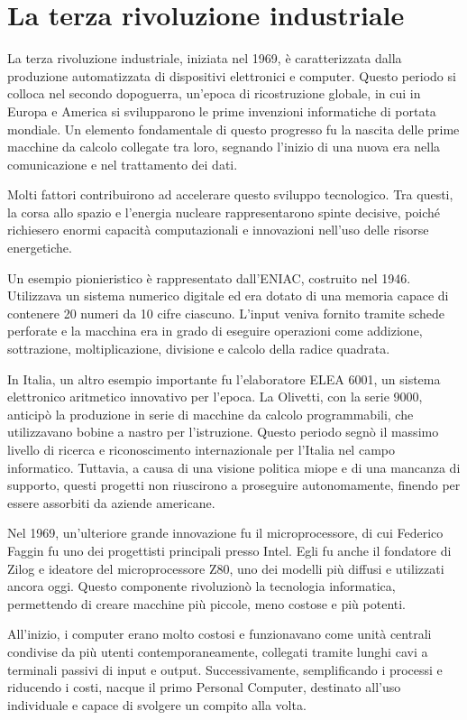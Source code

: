 
\section{La terza rivoluzione industriale}
La terza rivoluzione industriale, iniziata nel 1969, è caratterizzata dalla produzione automatizzata di dispositivi elettronici e computer. Questo periodo si colloca nel secondo dopoguerra, un’epoca di ricostruzione globale, in cui in Europa e America si svilupparono le prime invenzioni informatiche di portata mondiale. Un elemento fondamentale di questo progresso fu la nascita delle prime macchine da calcolo collegate tra loro, segnando l’inizio di una nuova era nella comunicazione e nel trattamento dei dati.

Molti fattori contribuirono ad accelerare questo sviluppo tecnologico. Tra questi, la corsa allo spazio e l’energia nucleare rappresentarono spinte decisive, poiché richiesero enormi capacità computazionali e innovazioni nell’uso delle risorse energetiche.

Un esempio pionieristico è rappresentato dall’ENIAC, costruito nel 1946. Utilizzava un sistema numerico digitale ed era dotato di una memoria capace di contenere 20 numeri da 10 cifre ciascuno. L’input veniva fornito tramite schede perforate e la macchina era in grado di eseguire operazioni come addizione, sottrazione, moltiplicazione, divisione e calcolo della radice quadrata.

In Italia, un altro esempio importante fu l’elaboratore ELEA 6001, un sistema elettronico aritmetico innovativo per l’epoca. La Olivetti, con la serie 9000, anticipò la produzione in serie di macchine da calcolo programmabili, che utilizzavano bobine a nastro per l’istruzione. Questo periodo segnò il massimo livello di ricerca e riconoscimento internazionale per l’Italia nel campo informatico. Tuttavia, a causa di una visione politica miope e di una mancanza di supporto, questi progetti non riuscirono a proseguire autonomamente, finendo per essere assorbiti da aziende americane.

Nel 1969, un’ulteriore grande innovazione fu il microprocessore, di cui Federico Faggin fu uno dei progettisti principali presso Intel. Egli fu anche il fondatore di Zilog e ideatore del microprocessore Z80, uno dei modelli più diffusi e utilizzati ancora oggi. Questo componente rivoluzionò la tecnologia informatica, permettendo di creare macchine più piccole, meno costose e più potenti.

All’inizio, i computer erano molto costosi e funzionavano come unità centrali condivise da più utenti contemporaneamente, collegati tramite lunghi cavi a terminali passivi di input e output. Successivamente, semplificando i processi e riducendo i costi, nacque il primo Personal Computer, destinato all’uso individuale e capace di svolgere un compito alla volta.

